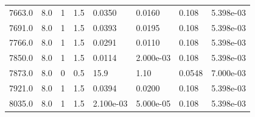 \documentclass[preview]{standalone}
\begin{document}
{{{{\begin{tabular}{L{1.2cm}C{1.2cm} C{0.3cm}C{0.5cm} C{1.4cm}C{1.4cm} C{1.4cm}C{1.4cm}}
  7663.0  &   8.0  & 1     & 1.5 &  0.0350  & 0.0160  & 0.108 &  5.398e-03   \\ 
  7691.0  &   8.0  & 1     & 1.5 &  0.0393  & 0.0195  & 0.108 &  5.398e-03   \\ 
  7766.0  &   8.0  & 1     & 1.5 &  0.0291  & 0.0110  & 0.108 &  5.398e-03   \\ 
  7850.0  &   8.0  & 1     & 1.5 &  0.0114  & 2.000e-03  & 0.108 &  5.398e-03   \\ 
  7873.0  &   8.0  & 0     & 0.5 &  15.9  & 1.10  & 0.0548 &  7.000e-03   \\ 
  7921.0  &   8.0  & 1     & 1.5 &  0.0394  & 0.0200  & 0.108 &  5.398e-03   \\ 
  8035.0  &   8.0  & 1     & 1.5 &  2.100e-03  & 5.000e-05  & 0.108 &  5.398e-03   \\ 
\hline 
\end{tabular} 

}}}}
\end{document}

